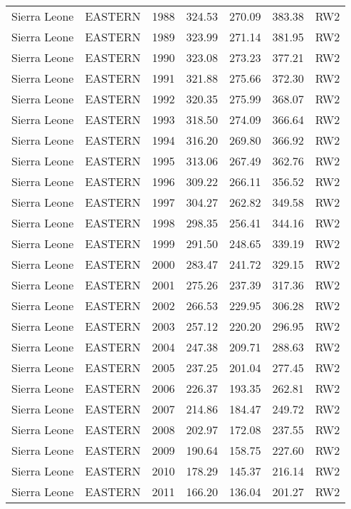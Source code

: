 \begin{longtable}{lllrrrl}
  Sierra Leone & EASTERN & 1988 & 324.53 & 270.09 & 383.38 & RW2 \\ 
  Sierra Leone & EASTERN & 1989 & 323.99 & 271.14 & 381.95 & RW2 \\ 
  Sierra Leone & EASTERN & 1990 & 323.08 & 273.23 & 377.21 & RW2 \\ 
  Sierra Leone & EASTERN & 1991 & 321.88 & 275.66 & 372.30 & RW2 \\ 
  Sierra Leone & EASTERN & 1992 & 320.35 & 275.99 & 368.07 & RW2 \\ 
  Sierra Leone & EASTERN & 1993 & 318.50 & 274.09 & 366.64 & RW2 \\ 
  Sierra Leone & EASTERN & 1994 & 316.20 & 269.80 & 366.92 & RW2 \\ 
  Sierra Leone & EASTERN & 1995 & 313.06 & 267.49 & 362.76 & RW2 \\ 
  Sierra Leone & EASTERN & 1996 & 309.22 & 266.11 & 356.52 & RW2 \\ 
  Sierra Leone & EASTERN & 1997 & 304.27 & 262.82 & 349.58 & RW2 \\ 
  Sierra Leone & EASTERN & 1998 & 298.35 & 256.41 & 344.16 & RW2 \\ 
  Sierra Leone & EASTERN & 1999 & 291.50 & 248.65 & 339.19 & RW2 \\ 
  Sierra Leone & EASTERN & 2000 & 283.47 & 241.72 & 329.15 & RW2 \\ 
  Sierra Leone & EASTERN & 2001 & 275.26 & 237.39 & 317.36 & RW2 \\ 
  Sierra Leone & EASTERN & 2002 & 266.53 & 229.95 & 306.28 & RW2 \\ 
  Sierra Leone & EASTERN & 2003 & 257.12 & 220.20 & 296.95 & RW2 \\ 
  Sierra Leone & EASTERN & 2004 & 247.38 & 209.71 & 288.63 & RW2 \\ 
  Sierra Leone & EASTERN & 2005 & 237.25 & 201.04 & 277.45 & RW2 \\ 
  Sierra Leone & EASTERN & 2006 & 226.37 & 193.35 & 262.81 & RW2 \\ 
  Sierra Leone & EASTERN & 2007 & 214.86 & 184.47 & 249.72 & RW2 \\ 
  Sierra Leone & EASTERN & 2008 & 202.97 & 172.08 & 237.55 & RW2 \\ 
  Sierra Leone & EASTERN & 2009 & 190.64 & 158.75 & 227.60 & RW2 \\ 
  Sierra Leone & EASTERN & 2010 & 178.29 & 145.37 & 216.14 & RW2 \\ 
  Sierra Leone & EASTERN & 2011 & 166.20 & 136.04 & 201.27 & RW2 \\ 

\end{longtable}
